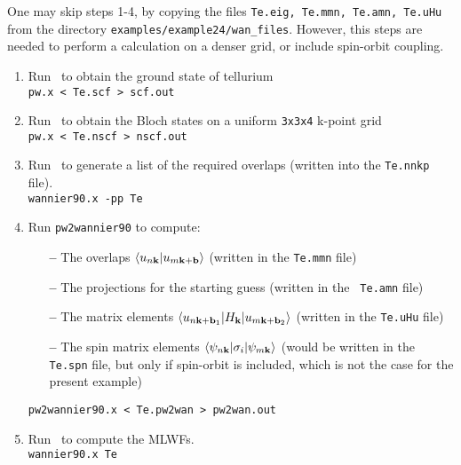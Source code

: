 \documentclass[a4paper,11pt,twoside]{article}
\begin{document}
One may skip steps 1-4, by copying the files {\tt Te.eig, Te.mmn, Te.amn, Te.uHu} 
from the directory {\tt examples/example24/wan\_files}. However, this steps are needed 
to perform a calculation on a denser grid, or include spin-orbit coupling.

\begin{enumerate}
\item Run \pwscf\ to obtain the ground state of tellurium\\
{\tt pw.x < Te.scf > scf.out}

\item Run \pwscf\ to obtain the Bloch states on a uniform {\tt 3x3x4} k-point
  grid\\ 
{\tt pw.x < Te.nscf > nscf.out}

\item Run \wannier\ to generate a list of the required overlaps (written
  into the {\tt Te.nnkp} file).\\
{\tt wannier90.x -pp Te}

\item Run {\tt pw2wannier90} to compute:
  \begin{itemize}

  \item[{\bf --}] The overlaps $\langle u_{n{\bf k}}\vert u_{m{\bf k}+{\bf
          b}}\rangle$ (written in the {\tt Te.mmn} file)

  \item[{\bf --}] The projections for the starting guess (written in the {\tt
        Te.amn} file)

  \item[{\bf --}] The matrix elements $\langle u_{n{\bf k}+{\bf b}_1}\vert
      H_{\bf k}\vert u_{m{\bf k}+{\bf b}_2}\rangle$ (written in the
      {\tt Te.uHu} file)

  \item[{\bf --}] The spin matrix elements $\langle \psi_{n{\bf
        k}}\vert \sigma_i\vert \psi_{m{\bf k}}\rangle$ (would be written in the
    {\tt Te.spn} file, but only if spin-orbit is included, which is not the case for the present example)

  \end{itemize}
{\tt pw2wannier90.x < Te.pw2wan > pw2wan.out}

\item Run \wannier\ to compute the MLWFs.\\
{\tt wannier90.x Te}


\end{enumerate}
\end{document}
